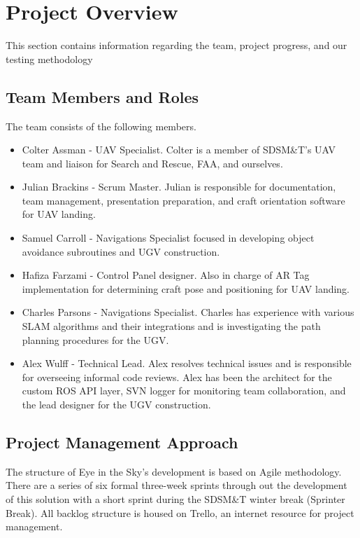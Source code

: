 

\chapter{Project Overview}
This section contains information regarding the team, project progress, and our testing methodology


\section{Team Members and Roles}
The team consists of the following members.

\begin{itemize}

  \item Colter Assman - UAV Specialist.  Colter is a member of SDSM\&T's UAV team and liaison for Search and Rescue, FAA, and ourselves.
  \item Julian Brackins - Scrum Master.  Julian is responsible for documentation, team management, presentation preparation, and craft orientation software for UAV landing.
  \item Samuel Carroll - Navigations Specialist focused in developing object avoidance subroutines and UGV construction.
  \item Hafiza Farzami - Control Panel designer. Also in charge of AR Tag implementation for determining craft pose and positioning for UAV landing.
  \item Charles Parsons - Navigations Specialist.  Charles has experience with various SLAM algorithms and their integrations and is investigating the path planning procedures for the UGV.
  \item Alex Wulff - Technical Lead.  Alex resolves technical issues and is responsible for overseeing informal code reviews. Alex has been the architect for the custom ROS API layer, SVN logger for monitoring team collaboration, and the lead designer for the UGV construction.

\end{itemize}


\section{Project  Management Approach}
The structure of Eye in the Sky's development is based on Agile methodology.  There are a series of six formal three-week sprints through out the development of this solution with a short sprint during the SDSM\&T winter break (Sprinter Break).  All backlog structure is housed on Trello, an internet resource for project management.  

